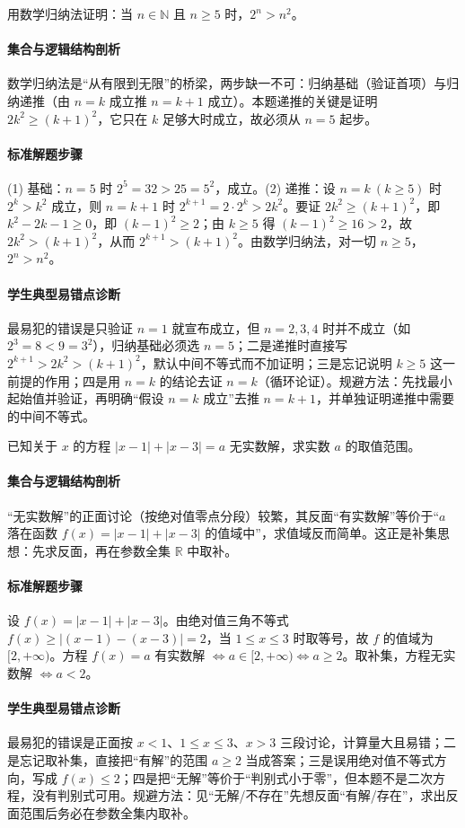 \begin{problem}
用数学归纳法证明：当 $n\in\mathbb{N}$ 且 $n\geq5$ 时，$2^n>n^2$。
\end{problem}
\begin{solution}
\paragraph{集合与逻辑结构剖析}
数学归纳法是“从有限到无限”的桥梁，两步缺一不可：归纳基础（验证首项）与归纳递推（由 $n=k$ 成立推 $n=k+1$ 成立）。本题递推的关键是证明 $2k^2\geq(k+1)^2$，它只在 $k$ 足够大时成立，故必须从 $n=5$ 起步。
\paragraph{标准解题步骤}
(1) 基础：$n=5$ 时 $2^5=32>25=5^2$，成立。(2) 递推：设 $n=k\ (k\geq5)$ 时 $2^k>k^2$ 成立，则 $n=k+1$ 时 $2^{k+1}=2\cdot2^k>2k^2$。要证 $2k^2\geq(k+1)^2$，即 $k^2-2k-1\geq0$，即 $(k-1)^2\geq2$；由 $k\geq5$ 得 $(k-1)^2\geq16>2$，故 $2k^2>(k+1)^2$，从而 $2^{k+1}>(k+1)^2$。由数学归纳法，对一切 $n\geq5$，$2^n>n^2$。
\paragraph{学生典型易错点诊断}
最易犯的错误是只验证 $n=1$ 就宣布成立，但 $n=2,3,4$ 时并不成立（如 $2^3=8<9=3^2$），归纳基础必须选 $n=5$；二是递推时直接写 $2^{k+1}>2k^2>(k+1)^2$，默认中间不等式而不加证明；三是忘记说明 $k\geq5$ 这一前提的作用；四是用 $n=k$ 的结论去证 $n=k$（循环论证）。规避方法：先找最小起始值并验证，再明确“假设 $n=k$ 成立”去推 $n=k+1$，并单独证明递推中需要的中间不等式。
\end{solution}

\begin{problem}
已知关于 $x$ 的方程 $|x-1|+|x-3|=a$ 无实数解，求实数 $a$ 的取值范围。
\end{problem}
\begin{solution}
\paragraph{集合与逻辑结构剖析}
“无实数解”的正面讨论（按绝对值零点分段）较繁，其反面“有实数解”等价于“$a$ 落在函数 $f(x)=|x-1|+|x-3|$ 的值域中”，求值域反而简单。这正是补集思想：先求反面，再在参数全集 $\mathbb{R}$ 中取补。
\paragraph{标准解题步骤}
设 $f(x)=|x-1|+|x-3|$。由绝对值三角不等式 $f(x)\geq|(x-1)-(x-3)|=2$，当 $1\leq x\leq3$ 时取等号，故 $f$ 的值域为 $[2,+\infty)$。方程 $f(x)=a$ 有实数解 $\iff a\in[2,+\infty)\iff a\geq2$。取补集，方程无实数解 $\iff a<2$。
\paragraph{学生典型易错点诊断}
最易犯的错误是正面按 $x<1$、$1\leq x\leq3$、$x>3$ 三段讨论，计算量大且易错；二是忘记取补集，直接把“有解”的范围 $a\geq2$ 当成答案；三是误用绝对值不等式方向，写成 $f(x)\leq2$；四是把“无解”等价于“判别式小于零”，但本题不是二次方程，没有判别式可用。规避方法：见“无解/不存在”先想反面“有解/存在”，求出反面范围后务必在参数全集内取补。
\end{solution}
